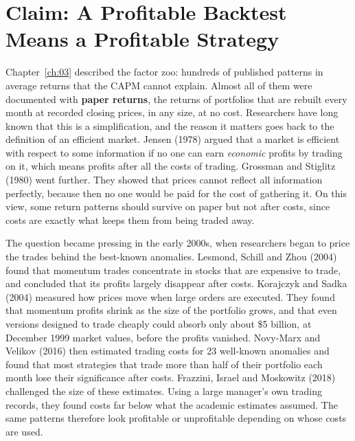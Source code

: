 \makeatletter
{}
\makeatother

\chapter{Claim: A Profitable Backtest Means a Profitable Strategy}
\label{ch:04}

Chapter~\ref{ch:03} described the factor zoo: hundreds of published patterns in average returns that the CAPM cannot explain. Almost all of them were documented with \textbf{paper returns}, the returns of portfolios that are rebuilt every month at recorded closing prices, in any size, at no cost. Researchers have long known that this is a simplification, and the reason it matters goes back to the definition of an efficient market. Jensen (1978) argued that a market is efficient with respect to some information if no one can earn \emph{economic} profits by trading on it, which means profits after all the costs of trading. Grossman and Stiglitz (1980) went further. They showed that prices cannot reflect all information perfectly, because then no one would be paid for the cost of gathering it. On this view, some return patterns should survive on paper but not after costs, since costs are exactly what keeps them from being traded away.

The question became pressing in the early 2000s, when researchers began to price the trades behind the best-known anomalies. Lesmond, Schill and Zhou (2004) found that momentum trades concentrate in stocks that are expensive to trade, and concluded that its profits largely disappear after costs. Korajczyk and Sadka (2004) measured how prices move when large orders are executed. They found that momentum profits shrink as the size of the portfolio grows, and that even versions designed to trade cheaply could absorb only about \$5 billion, at December 1999 market values, before the profits vanished. Novy-Marx and Velikov (2016) then estimated trading costs for 23 well-known anomalies and found that most strategies that trade more than half of their portfolio each month lose their significance after costs. Frazzini, Israel and Moskowitz (2018) challenged the size of these estimates. Using a large manager's own trading records, they found costs far below what the academic estimates assumed. The same patterns therefore look profitable or unprofitable depending on whose costs are used.

